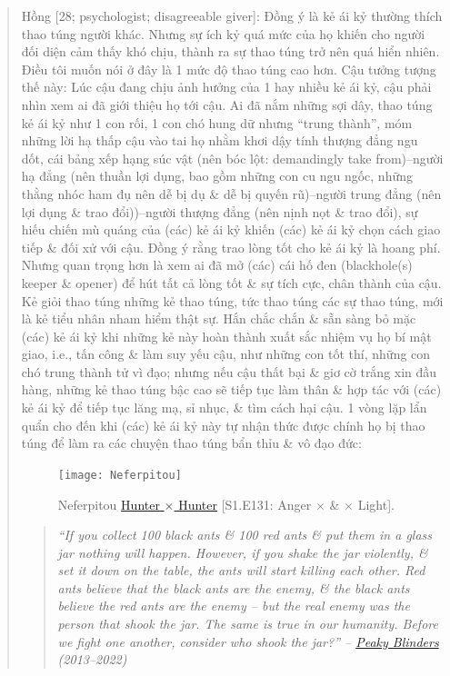 \documentclass[12pt,twoside]{book}
\begin{document}
\begin{quote}
	{\sf Hồng [28; psychologist; disagreeable giver]:} Đồng ý là kẻ ái kỷ thường thích thao túng người khác. Nhưng sự ích kỷ quá mức của họ khiến cho người đối diện cảm thấy khó chịu, thành ra sự thao túng trở nên quá hiển nhiên. Điều tôi muốn nói ở đây là 1 mức độ thao túng cao hơn. Cậu tưởng tượng thế này: Lúc cậu đang chịu ảnh hưởng của 1 hay nhiều kẻ ái kỷ, cậu phải nhìn xem ai đã giới thiệu họ tới cậu. Ai đã nắm những sợi dây, thao túng kẻ ái kỷ như 1 con rối, 1 con chó hung dữ nhưng ``trung thành'', móm những lời hạ thấp cậu vào tai họ nhằm khơi dậy tính thượng đẳng ngu dốt, cái bảng xếp hạng súc vật (nên bóc lột: demandingly take from)--người hạ đẳng (nên thuần lợi dụng, bao gồm những con cu ngu ngốc, những thằng nhóc ham đụ nên dễ bị dụ \& dễ bị quyến rũ)--người trung đẳng (nên lợi dụng \& trao đổi))--người thượng đẳng (nên nịnh nọt \& trao đổi), sự hiếu chiến mù quáng của (các) kẻ ái kỷ khiến (các) kẻ ái kỷ chọn cách giao tiếp \& đối xử với cậu. Đồng ý rằng trao lòng tốt cho kẻ ái kỷ là hoang phí. Nhưng quan trọng hơn là xem ai đã mở (các) cái hố đen (blackhole(s) keeper \& opener) để hút tất cả lòng tốt \& sự tích cực, chân thành của cậu. Kẻ giỏi thao túng những kẻ thao túng, tức thao túng các sự thao túng, mới là kẻ tiểu nhân nham hiểm thật sự. Hắn chắc chắn \& sẵn sàng bỏ mặc (các) kẻ ái kỷ khi những kẻ này hoàn thành xuất sắc nhiệm vụ họ bí mật giao, i.e., tấn công \& làm suy yếu cậu, như những con tốt thí, những con chó trung thành tử vì đạo; nhưng nếu cậu thất bại \& giơ cờ trắng xin đầu hàng, những kẻ thao túng bậc cao sẽ tiếp tục làm thân \& hợp tác với (các) kẻ ái kỷ để tiếp tục lăng mạ, sỉ nhục, \& tìm cách hại cậu. 1 vòng lặp lẩn quẩn cho đến khi (các) kẻ ái kỷ này tự nhận thức được chính họ bị thao túng để làm ra các chuyện thao túng bẩn thỉu \& vô đạo đức:
	\begin{figure}[H]
		\centering
		\texttt{[image: Neferpitou]}
		\caption{{\sf Neferpitou} \href{https://www.imdb.com/title/tt3748420/}{Hunter $\times$ Hunter} [S1.E131: Anger $\times$ \& $\times$ Light].}
	\end{figure}
	\begin{quote}\it
		``If you collect 100 black ants \&  100 red ants \& put them in a glass jar nothing will happen. However, if you shake the jar violently, \&  set it down on the table, the ants will start killing each other. Red ants believe that the black ants are the enemy, \&  the black ants believe the red ants are the enemy -- but the real enemy was the person that shook the jar. The same is true in our humanity. Before we fight one another, consider who shook the jar?'' -- \href{https://www.imdb.com/title/tt2442560/}{Peaky Blinders} (2013--2022)
		

\end{quote}
\end{quote}
\end{document}
